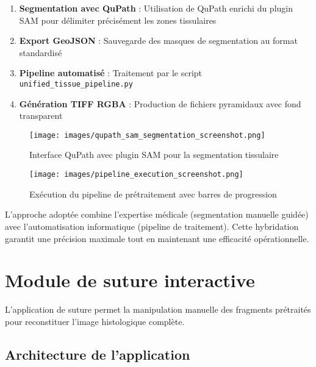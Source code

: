 \documentclass[11pt,a4paper]{report}
\begin{document}
\begin{enumerate}
\item \textbf{Segmentation avec QuPath} : Utilisation de QuPath enrichi du plugin SAM pour délimiter précisément les zones tissulaires
\item \textbf{Export GeoJSON} : Sauvegarde des masques de segmentation au format standardisé
\item \textbf{Pipeline automatisé} : Traitement par le script \texttt{unified\_tissue\_pipeline.py}
\item \textbf{Génération TIFF RGBA} : Production de fichiers pyramidaux avec fond transparent
\end{enumerate}

\begin{figure}[htbp]
\centering
\texttt{[image: images/qupath\_sam\_segmentation\_screenshot.png]}
\caption{Interface QuPath avec plugin SAM pour la segmentation tissulaire}
\end{figure}

\begin{figure}[htbp]
\centering
\texttt{[image: images/pipeline\_execution\_screenshot.png]}
\caption{Exécution du pipeline de prétraitement avec barres de progression}
\end{figure}

L'approche adoptée combine l'expertise médicale (segmentation manuelle guidée) avec l'automatisation informatique (pipeline de traitement). Cette hybridation garantit une précision maximale tout en maintenant une efficacité opérationnelle.

\section{Module de suture interactive}

L'application de suture permet la manipulation manuelle des fragments prétraités pour reconstituer l'image histologique complète.

\subsection{Architecture de l'application}
\end{document}
